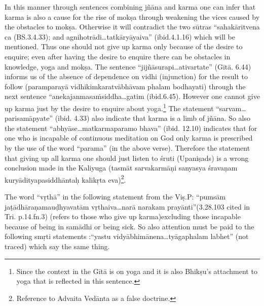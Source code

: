 In this manner through sentences combining jñāna and karma one can infer that karma is also a cause for the rise of mokṣa through weakening the vices caused by the obstacles to mokṣa. Otherwise it will contradict the two sūtras “sahakāritvena ca (BS.3.4.33); and agnihotrādi…tatkāryāyaiva” (ibid.4.1.16) which will be mentioned. Thus one should not give up karma only because of the desire to enquire; even after having the desire to enquire there can be obstacles in knowledge, yoga and mokṣa. The sentence “jijñāsurapi…ativartate” (Gītā. 6.44) informs us of the absence of dependence on vidhi (injunction) for the result to follow (paramparayā vidhikimkaratvābhāvam phalam bodhayati) through the next sentence “anekajanmasaṁsiddha…gatim (ibid.6.45). However one cannot give up karma just by the desire to enquire about yoga.\footnote{Since the context in the Gītā is on yoga and it is also Bhikṣu’s attachment to yoga that is reflected in this sentence.} The statement “sarvam…parisamāpyate” (ibid. 4.33) also indicate that karma is a limb of jñāna. So also the statement “abhyāse…matkarmaparamo bhava” (ibid. 12.10) indicates that for one who is incapable of continuous meditation on God only karma is prescribed by the use of the word “parama” (in the above verse). Therefore the statement that giving up all karma one should just listen to śruti (Upaniṣads) is a wrong conclusion made in the Kaliyuga (tasmāt sarvakarmāṇi sanyasya śravaṇam kuryādityapasiddhāntaḥ kalikṛta eva)\footnote{Reference to Advaita Vedānta as a false doctrine.}. 

The word “vṛthā” in the following statement from the Viṣ.P: “pumsām jaṭādhāraṇamauḍhyavatām vṛthaiva…narā narakam prayānti”\break (3.28.103 cited in Tri. p.14.fn.3) (refers to those who give up karma)\break excluding those incapable because of being in samādhi or being sick.  So also attention must be paid to the following smṛti statements :\break “yastu vidyābhimānena…tyāgaphalam labhet” (not traced) which say the same thing.

